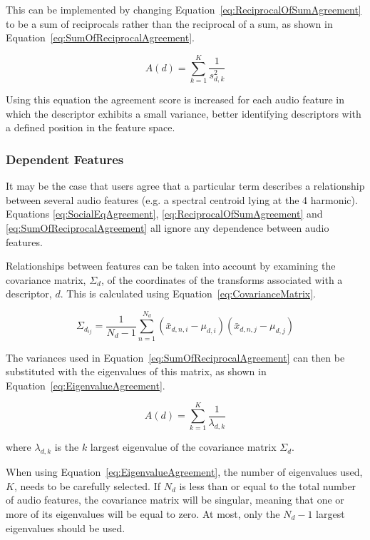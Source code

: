 			This can be implemented by changing Equation~\ref{eq:ReciprocalOfSumAgreement} to be a sum of
			reciprocals rather than the reciprocal of a sum, as shown in
			Equation~\ref{eq:SumOfReciprocalAgreement}.

			\begin{equation}
				A(d) = \sum_{k = 1}^{K} \frac{1}{s_{d,k}^{2}}
				\label{eq:SumOfReciprocalAgreement}
			\end{equation}

			Using this equation the agreement score is increased for each audio feature in which the
			descriptor exhibits a small variance, better identifying descriptors with a defined position in
			the feature space.

		\subsubsection*{Dependent Features}
			It may be the case that users agree that a particular term describes a relationship between several
			audio features (e.g. a spectral centroid lying at the 4 harmonic). Equations
			\ref{eq:SocialEqAgreement}, \ref{eq:ReciprocalOfSumAgreement} and \ref{eq:SumOfReciprocalAgreement}
			all ignore any dependence between audio features.

			Relationships between features can be taken into account by examining the covariance matrix,
			$\Sigma_{d}$, of the coordinates of the transforms associated with a descriptor, $d$. This is
			calculated using Equation~\ref{eq:CovarianceMatrix}.

			\begin{equation}
				{\Sigma_{d_{ij}}} = \frac{1}{N_{d} - 1} \sum_{n = 1}^{N_{d}} 
						     (\bar{x}_{d,n,i} - \mu_{d,i})(\bar{x}_{d,n,j} - \mu_{d,j})
				\label{eq:CovarianceMatrix}
			\end{equation}
			
			The variances used in Equation~\ref{eq:SumOfReciprocalAgreement} can then be substituted with the
			eigenvalues of this matrix, as shown in Equation~\ref{eq:EigenvalueAgreement}.

			\begin{equation}
				A(d) = \sum_{k = 1}^{K} \frac{1}{\lambda_{d,k}}
				\label{eq:EigenvalueAgreement}
			\end{equation}
			
			where $\lambda_{d, k}$ is the $k$ largest eigenvalue of the covariance matrix
			$\Sigma_{d}$.

			When using Equation~\ref{eq:EigenvalueAgreement}, the number of eigenvalues used, $K$, needs to be
			carefully selected. If $N_{d}$ is less than or equal to the total number of audio features, the
			covariance matrix will be singular, meaning that one or more of its eigenvalues will be equal to
			zero. At most, only the $N_{d} - 1$ largest eigenvalues should be used.
			
